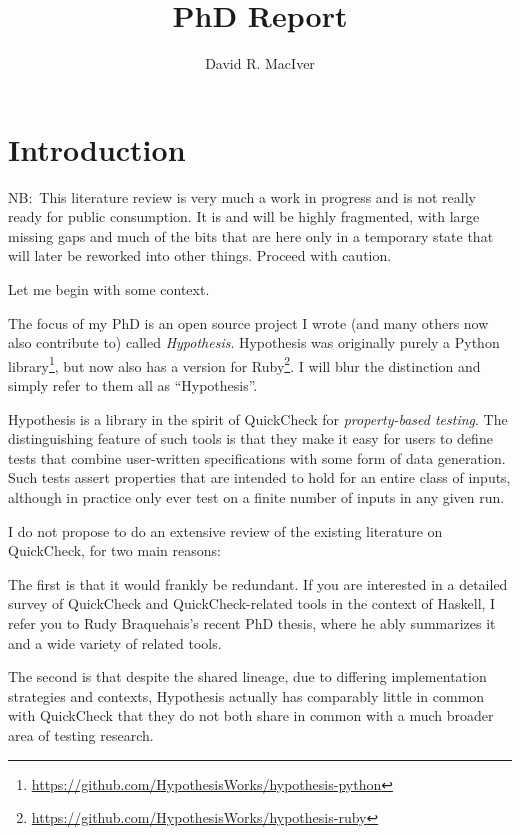 

\title{PhD Report}
\author{David R. MacIver}



\maketitle

\tableofcontents

\chapter{Introduction}

NB:\ This literature review is very much a work in progress and is not really ready for public consumption.
It is and will be highly fragmented,
with large missing gaps and much of the bits that are here only in a temporary state that will later be reworked into other things.
Proceed with caution.

Let me begin with some context.

The focus of my PhD is an open source project I wrote (and many others now also contribute to) called \emph{Hypothesis}.
Hypothesis was originally purely a Python library\footnote{\url{https://github.com/HypothesisWorks/hypothesis-python}},
but now also has a version for Ruby\footnote{\url{https://github.com/HypothesisWorks/hypothesis-ruby}}.
I will blur the distinction and simply refer to them all as ``Hypothesis''.

Hypothesis is a library in the spirit of QuickCheck\cite{DBLP:conf/icfp/ClaessenH00} for \emph{property-based testing}.
The distinguishing feature of such tools is that they make it easy for users to define tests that combine user-written specifications with some form of data generation.
Such tests assert properties that are intended to hold for an entire class of inputs,
although in practice only ever test on a finite number of inputs in any given run.

I do not propose to do an extensive review of the existing literature on QuickCheck,
for two main reasons:

The first is that it would frankly be redundant.
If you are interested in a detailed survey of QuickCheck and QuickCheck-related tools in the context of Haskell,
I refer you to Rudy Braquehais's recent PhD thesis\cite{matela2017tools},
where he ably summarizes it and a wide variety of related tools.

The second is that despite the shared lineage,
due to differing implementation strategies and contexts,
Hypothesis actually has comparably little in common with QuickCheck that they do not both share in common with a much broader area of testing research.

